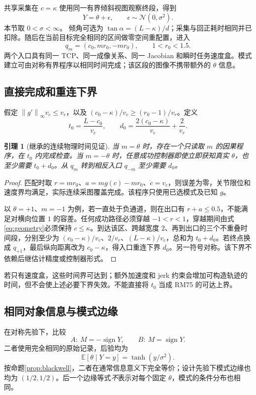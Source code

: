 \documentclass[UTF8,11pt,a4paper,fontset=fandol]{ctexart}
\numberwithin{equation}{section}
\newtheorem{lemma}[theorem]{引理}
\theoremstyle{definition}
\newcommand{\E}{\mathbb E}
\newcommand{\N}{\mathcal N}
\newcommand{\norm}[1]{\left\lVert#1\right\rVert}
\begin{document}
共享采集在 $c=\kappa$ 使用同一有界倾斜视图观察终段，得到
\begin{equation}
Y=\theta+\epsilon,\qquad \epsilon\sim\N(0,\sigma^2).
\end{equation}
本节取 $0<\sigma<\infty$。
倾角可选为 $\tan\alpha=(L-\kappa)/d$；采集与回正耗时相同并已扣除。随后在当前目标完全相同的区间做零空间重配置，进入
\begin{equation}
q_m=(c_0,mr_0,-mr_0),\qquad 1<r_0<1.5.
\label{eq:entry}
\end{equation}
两个入口具有同一 TCP、同一成像关系、同一 Jacobian 和瞬时任务速度盒。模式建立可由对称有界程序以相同时间完成；该区段的图像不携带额外的 $\theta$ 信息。

\subsection{直接完成和重连下界}
假定 $\norm{g'}_\infty v_c\le v_r$，以及
$(c_0-\kappa)/v_c\ge(r_0-1)/v_r$。定义
\begin{equation}
t_0=\frac{L-c_0}{v_c},\qquad
d_0=\frac{2(c_0-\kappa)}{v_c}+\frac{2}{v_r}.
\label{eq:times}
\end{equation}

\begin{lemma}[继承的连续物理时间见证]
\label{lem:time}
当 $m=\theta$ 时，存在一个只读取 $m$ 的因果程序，在 $t_0$ 内完成检查。当 $m=-\theta$ 时，任意成功控制器即使立即获知真实 $\theta$，也至少需要 $t_0+d_0$。从 $q_m$ 转到相反入口 $q_{-m}$ 至少需要 $d_0$。
\end{lemma}
\begin{proof}
匹配时取 $r=mr_0$、$a=m g(c)-mr_0$、$\dot c=v_c$，则误差为零，关节限位和速度界均满足，实际连续采图覆盖完成。该程序只使用已选模式及已知 $g$。

以 $\theta=+1$、$m=-1$ 为例，若一直处于负通道，则在出口有 $r+a\le0.5$，不能满足对横向位置 $1$ 的容差。任何成功路径必须穿越 $-1<r<1$，穿越期间由式\eqref{eq:geometry}必须保持 $c\le\kappa$。到达该区、跨越宽度 $2$、再到出口的三个不重叠时间段，分别至少为 $(c_0-\kappa)/v_c$、$2/v_r$、$(L-\kappa)/v_c$，总和为 $t_0+d_0$。若终点换成 $q_{+1}$，最后纵向距离改为 $c_0-\kappa$，得入口重连下界 $d_0$。另一符号对称。该下界不依赖后继估计精度或控制器形式。\end{proof}

若只有速度盒，这些时间界可达到；额外加速度和 jerk 约束会增加可构造轨迹的时间，但不会使上述必要下界失效。不能直接将 $t_0$ 当成 RM75 的可达上界。

\subsection{相同对象信息与模式边缘}
在对称先验下，比较
\begin{equation}
A:\ M=-\operatorname{sign}Y,\qquad
B:\ M=\operatorname{sign}Y.
\label{eq:badgood}
\end{equation}
二者使用完全相同的原始记录，后验均为
\begin{equation}
\E[\theta\mid Y=y]=\tanh(y/\sigma^2).
\end{equation}
按命题\ref{prop:blackwell}，二者在通常信息意义下完全等价；设计先验下模式边缘也均为 $(1/2,1/2)$。后一个边缘等式\emph{不}表示对每个固定 $\theta$，模式的条件分布也相同。
\end{document}
